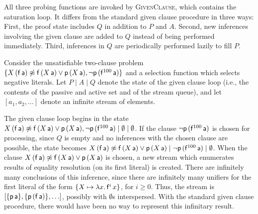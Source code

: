 \documentclass[smallcondensed,draft]{svjour3}     %
\begin{document}
All three probing functions are invoked by
\textsc{GivenClause}, which contains the saturation loop. It differs
from the standard given clause procedure in three ways:
First, the proof state includes $Q$ in addition to $P$ and $A$. Second,
new inferences involving the given clause are added to $Q$ instead of being
performed immediately. Third, inferences in $Q$ are periodically performed
lazily to fill $P$.

\newcommand\infstream[1]{[#1]}

\begin{examplex} 
  \begin{sloppypar}
  Consider the unsatisfiable two-clause problem $\{ X \, (\mathsf{f} \,
  \mathsf{a}) \not\approx \mathsf{f} \, (X \, \mathsf{a}) \lor \mathsf{p} \, (X \, \mathsf{a}),\allowbreak
  \neg \mathsf{p} \, (\mathsf{f}^{100} \, \mathsf{a})  \}$ and a selection function which
  selects negative literals.
  Let $P \mid A \mid Q$ denote
  the state of the given clause loop (i.e., the contents of the passive and active set
  and of the stream queue), and let $\infstream{ a_1, a_2, \ldots }$
  denote an infinite stream of elements.
  \end{sloppypar}

  The given clause loop begins in the state $X \, (\mathsf{f} \, \mathsf{a}) \not\approx
  \mathsf{f} \, (X \, \mathsf{a}) \lor \mathsf{p} \, (X \, \mathsf{a}), \neg \mathsf{p} \,
  (\mathsf{f}^{100} \, \mathsf{a}) \mid \emptyset \mid \emptyset$. If the clause $\neg
  \mathsf{p} \, (\mathsf{f}^{100} \, \mathsf{a})$ is chosen for processing, since $Q$ is empty
  and no inferences with the chosen clause are possible, the state becomes $X \,
  (\mathsf{f} \, \mathsf{a}) \not\approx \mathsf{f} \, (X \, \mathsf{a}) \lor \mathsf{p} \, (X \,
  \mathsf{a}) \mid \neg \mathsf{p} \, (\mathsf{f}^{100} \, \mathsf{a}) \mid \emptyset$. When
  the clause $X \, (\mathsf{f} \, \mathsf{a}) \not\approx \mathsf{f} \, (X \, \mathsf{a}) \lor
  \mathsf{p} \, (X \, \mathsf{a})$ is chosen, a new stream which enumerates results of
  equality resolution (on its first literal) is created. There are infinitely many
  conclusions of this inference, since there are infinitely many unifiers for the
  first literal of the form $\{ X \mapsto \lambda x. \, \mathsf{f}^i \, x \}$, for
  $i \geq 0$. Thus, the stream is $\infstream{ \{\cst{p} \, \cst{a}\}, \{\cst{p} \, (\cst{f}\,\cst{a})\}, \ldots }$,
  possibly with $\emptyset$s interspersed. With the standard given clause procedure,
  there would have been no way to represent this infinitary result.


\end{examplex}
\end{document}
